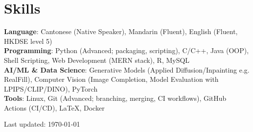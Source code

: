 \documentclass[a4paper,11pt]{article}
\begin{document}
\section{Skills}
  \begin{itemize}[leftmargin=0.15in, label={}]
    \small{\item{
      \textbf{Language}{: Cantonese (Native Speaker), Mandarin (Fluent), English (Fluent, HKDSE level 5)} \\[2pt]
      \textbf{Programming}{: Python (Advanced; packaging, scripting), C/C++, Java (OOP), Shell Scripting, Web Development (MERN stack), R, MySQL} \\[2pt]
      \textbf{AI/ML \& Data Science}{: Generative Models (Applied Diffusion/Inpainting e.g. RealFill), Computer Vision (Image Completion, Model Evaluation with LPIPS/CLIP/DINO), PyTorch} \\[2pt]
      \textbf{Tools}{: Linux, Git (Advanced; branching, merging, CI workflows), GitHub Actions (CI/CD), LaTeX, Docker}
    }}
  \end{itemize}

\vfill
\begin{center}
\footnotesize
Last updated: \today
\end{center}
\end{document}
